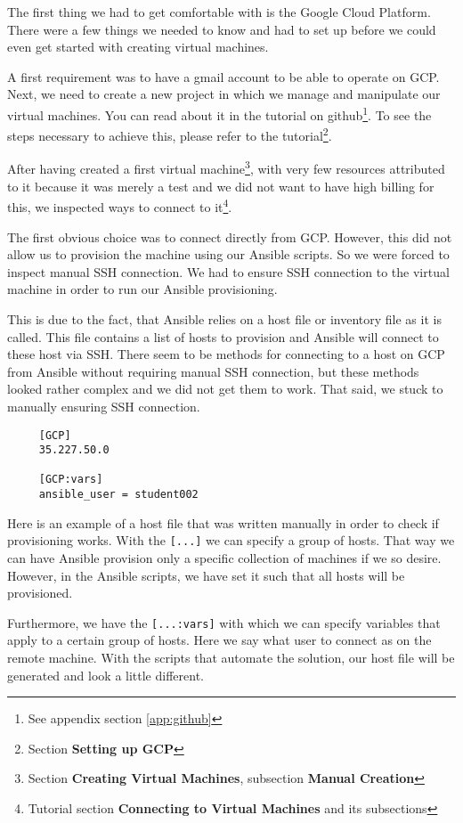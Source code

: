 The first thing we had to get comfortable with is the Google Cloud
Platform. There were a few things we needed to know and had to set up
before we could even get started with creating virtual machines.

A first requirement was to have a gmail account to be able to operate
on GCP. Next, we need to create a new project in which we manage and
manipulate our virtual machines.  You can read about it in the
tutorial on github\footnote{See appendix section \ref{app:github}}.
To see the steps necessary to achieve this, please refer to the
tutorial\footnote{Section \textbf{Setting up GCP}}.

After having created a first virtual machine\footnote{Section
\textbf{Creating Virtual Machines}, subsection \textbf{Manual
Creation}}, with very few resources attributed to it because it was
merely a test and we did not want to have high billing for this, we
inspected ways to connect to it\footnote{Tutorial section
\textbf{Connecting to Virtual Machines} and its subsections}.

The first obvious choice was to connect directly from GCP. However,
this did not allow us to provision the machine using our Ansible
scripts. So we were forced to inspect manual SSH connection. We had to
ensure SSH connection to the virtual machine in order to run our
Ansible provisioning. 

This is due to the fact, that Ansible relies on a host file or
inventory file as it is called. This file contains a list of hosts to
provision and Ansible will connect to these host via SSH. There seem
to be methods for connecting to a host on GCP from Ansible without
requiring manual SSH connection, but these methods looked rather
complex and we did not get them to work. That said, we stuck to
manually ensuring SSH connection.

\begin{verbatim}
	 [GCP]
	 35.227.50.0

	 [GCP:vars]
	 ansible_user = student002
\end{verbatim}

Here is an example of a host file that was written manually in order
to check if provisioning works. With the \verb|[...]| we can specify a
group of hosts. That way we can have Ansible provision only a specific
collection of machines if we so desire. However, in the Ansible
scripts, we have set it such that all hosts will be provisioned.

Furthermore, we have the \verb|[...:vars]| with which we can specify
variables that apply to a certain group of hosts. Here we say what
user to connect as on the remote machine. With the scripts that
automate the solution, our host file will be generated and look a
little different.

